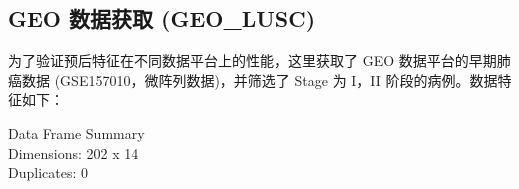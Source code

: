 \documentclass[
]{article}
\begin{document}
\begin{center}\vspace{1.5cm}\end{center}

\hypertarget{geo-ux6570ux636eux83b7ux53d6-geo_lusc}{%
\subsection{GEO 数据获取 (GEO\_LUSC)}\label{geo-ux6570ux636eux83b7ux53d6-geo_lusc}}

为了验证预后特征在不同数据平台上的性能，这里获取了 GEO 数据平台的早期肺癌数据 (GSE157010，微阵列数据)，并筛选了 Stage 为 I，II 阶段的病例。数据特征如下：

Data Frame Summary\\
Dimensions: 202 x 14\\
Duplicates: 0
\end{document}
